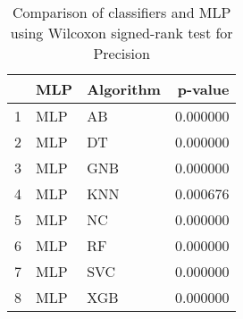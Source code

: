 \begin{table}
\footnotesize
\caption{Comparison of classifiers and MLP using Wilcoxon signed-rank test for Precision}
\label{tab:MLP wilcoxon Precision comparison}
\begin{tabular}{lllr}
\hline
 & MLP & Algorithm & p-value \\
\hline
1 & MLP & AB & 0.000000 \\
2 & MLP & DT & 0.000000 \\
3 & MLP & GNB & 0.000000 \\
4 & MLP & KNN & 0.000676 \\
5 & MLP & NC & 0.000000 \\
6 & MLP & RF & 0.000000 \\
7 & MLP & SVC & 0.000000 \\
8 & MLP & XGB & 0.000000 \\
\hline
\end{tabular}
\end{table}
